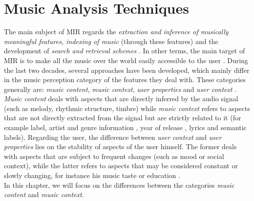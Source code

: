 \chapter{Music Analysis Techniques} 
\label{Chapter2} 

The main subject of MIR regards the \textit{extraction and inference of musically meaningful features, indexing of music} (through these features) and the development of \textit{search and retrieval schemes} \cite{downieMIR}. In other terms, the main target of MIR is to make all the music over the world easily accessible to the user \cite{downieMIR}. During the last two decades, several approaches have been developed, which mainly differ in the music perception category of the features they deal with. These categories generally are: \textit{music content}, \textit{music context}, \textit{user properties} and \textit{user context} \cite{gomez14}. \textit{Music content} deals with aspects that are directly inferred by the audio signal (such as melody, rhythmic structure, timbre) while \textit{music context} refers to aspects that are not directly extracted from the signal but are strictly related to it (for example label\cite{pachet00}, artist and genre information \cite{perfe11} \cite{aizenberg12}, year of release \cite{vangulik05}, lyrics \cite{coelho13} and semantic labels). Regarding the user, the difference between \textit{user context} and \textit{user properties} lies on the stability of aspects of the user himself. The former deals with aspects that are subject to frequent changes (such as mood or social context), while the latter refers to aspects that may be considered constant or slowly changing, for instance his music taste or education \cite{gomez14}. \\In this chapter, we will focus on the differences between the categories \textit{music content} and \textit{music context}. 


